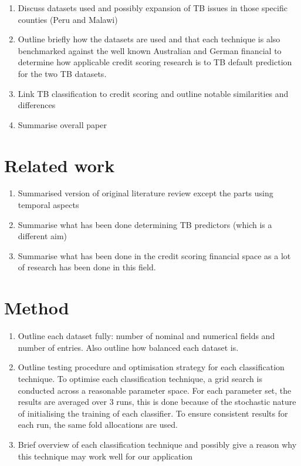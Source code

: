\documentclass{sig-alternate-05-2015}
\begin{document}
\begin{enumerate}
	\item Discuss datasets used and possibly expansion of TB issues in those specific counties (Peru and Malawi)
	\item Outline briefly how the datasets are used and that each technique is also benchmarked against the well known Australian and German financial to determine how applicable credit scoring research is to TB default prediction for the two TB datasets.
	\item Link TB classification to credit scoring and outline notable similarities and differences
	\item Summarise overall paper
\end{enumerate}

\section{Related work}
\begin{enumerate}
	\item Summarised version of original literature review except the parts using temporal aspects
	\item Summarise what has been done determining TB predictors (which is a different aim)
	\item Summarise what has been done in the credit scoring financial space as a lot of research has been done in this field.
\end{enumerate}

\section{Method}
\begin{enumerate}
	\item Outline each dataset fully: number of nominal and numerical fields and number of entries. Also outline how balanced each dataset is.
	\item Outline testing procedure and optimisation strategy for each classification technique. To optimise each classification technique, a grid search is conducted across a reasonable parameter space. For each parameter set, the results are averaged over 3 runs, this is done because of the stochastic nature of initialising the training of each classifier. To ensure consistent results for each run, the same fold allocations are used.
	\item Brief overview of each classification technique and possibly give a reason why this technique may work well for our application
\end{enumerate}
\end{document}
